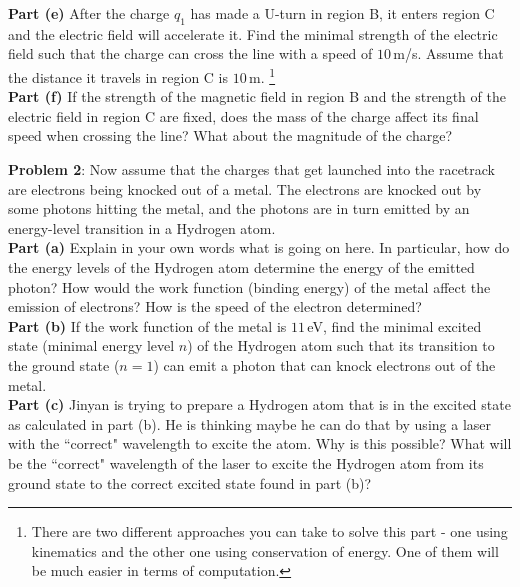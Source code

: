\documentclass[11pt]{article}
\begin{document}
\noindent\textbf{Part (e)} After the charge $q_1$ has made a U-turn in region B, it enters region C and the electric field will accelerate it. Find the minimal strength of the electric field such that the charge can cross the line with a speed of $10\,$m/s. Assume that the distance it travels in region C is $10$\,m. \footnote{There are two different approaches you can take to solve this part - one using kinematics and the other one using conservation of energy. One of them will be much easier in terms of computation.}\\

\noindent\textbf{Part (f)} If the strength of the magnetic field in region B and the strength of the electric field in region C are fixed, does the mass of the charge affect its final speed when crossing the line? What about the magnitude of the charge? 

\newpage
\noindent\textbf{Problem 2}: Now assume that the charges that get launched into the racetrack are electrons being knocked out of a metal. The electrons are knocked out by some photons hitting the metal, and the photons are in turn emitted by an energy-level transition in a Hydrogen atom.\\

\noindent\textbf{Part (a)} Explain in your own words what is going on here. In particular, how do the energy levels of the Hydrogen atom determine the energy of the emitted photon? How would the work function (binding energy) of the metal affect the emission of electrons? How is the speed of the electron determined?\\

\noindent\textbf{Part (b)} If the work function of the metal is $11$\,eV, find the minimal excited state (minimal energy level $n$) of the Hydrogen atom such that its transition to the ground state ($n=1$) can emit a photon that can knock electrons out of the metal.\\

\noindent\textbf{Part (c)} Jinyan is trying to prepare a Hydrogen atom that is in the excited state as calculated in part (b). He is thinking maybe he can do that by using a laser with the ``correct" wavelength to excite the atom. Why is this possible? What will be the ``correct" wavelength of the laser to excite the Hydrogen atom from its ground state to the correct excited state found in part (b)?\\
\end{document}
